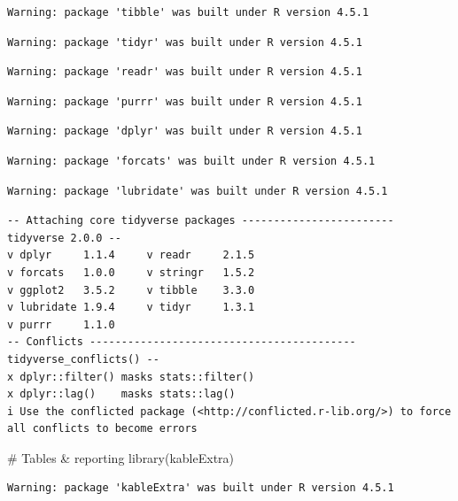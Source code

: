 \documentclass[
  letterpaper,
  DIV=11,
  numbers=noendperiod]{scrreprt}
\newenvironment{Shaded}{\begin{snugshade}}{\end{snugshade}}
\newcommand{\CommentTok}[1]{\textcolor[rgb]{0.37,0.37,0.37}{#1}}
\newcommand{\FunctionTok}[1]{\textcolor[rgb]{0.28,0.35,0.67}{#1}}
\newcommand{\NormalTok}[1]{\textcolor[rgb]{0.00,0.23,0.31}{#1}}
\begin{document}
\begin{verbatim}
Warning: package 'tibble' was built under R version 4.5.1
\end{verbatim}

\begin{verbatim}
Warning: package 'tidyr' was built under R version 4.5.1
\end{verbatim}

\begin{verbatim}
Warning: package 'readr' was built under R version 4.5.1
\end{verbatim}

\begin{verbatim}
Warning: package 'purrr' was built under R version 4.5.1
\end{verbatim}

\begin{verbatim}
Warning: package 'dplyr' was built under R version 4.5.1
\end{verbatim}

\begin{verbatim}
Warning: package 'forcats' was built under R version 4.5.1
\end{verbatim}

\begin{verbatim}
Warning: package 'lubridate' was built under R version 4.5.1
\end{verbatim}

\begin{verbatim}
-- Attaching core tidyverse packages ------------------------ tidyverse 2.0.0 --
v dplyr     1.1.4     v readr     2.1.5
v forcats   1.0.0     v stringr   1.5.2
v ggplot2   3.5.2     v tibble    3.3.0
v lubridate 1.9.4     v tidyr     1.3.1
v purrr     1.1.0     
-- Conflicts ------------------------------------------ tidyverse_conflicts() --
x dplyr::filter() masks stats::filter()
x dplyr::lag()    masks stats::lag()
i Use the conflicted package (<http://conflicted.r-lib.org/>) to force all conflicts to become errors
\end{verbatim}

\begin{Shaded}
\begin{Highlighting}[]
\CommentTok{\# Tables \& reporting}
\FunctionTok{library}\NormalTok{(kableExtra)}
\end{Highlighting}
\end{Shaded}

\begin{verbatim}
Warning: package 'kableExtra' was built under R version 4.5.1
\end{verbatim}
\end{document}
